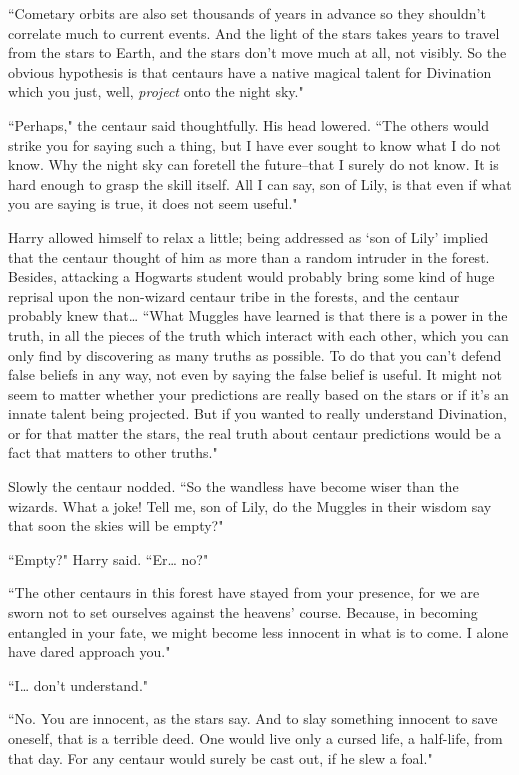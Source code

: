 ``Cometary orbits are also set thousands of years in advance so they shouldn't correlate much to current events. And the light of the stars takes years to travel from the stars to Earth, and the stars don't move much at all, not visibly. So the obvious hypothesis is that centaurs have a native magical talent for Divination which you just, well, \emph{project} onto the night sky."

``Perhaps," the centaur said thoughtfully. His head lowered. ``The others would strike you for saying such a thing, but I have ever sought to know what I do not know. Why the night sky can foretell the future\---that I surely do not know. It is hard enough to grasp the skill itself. All I can say, son of Lily, is that even if what you are saying is true, it does not seem useful."

Harry allowed himself to relax a little; being addressed as `son of Lily' implied that the centaur thought of him as more than a random intruder in the forest. Besides, attacking a Hogwarts student would probably bring some kind of huge reprisal upon the non-wizard centaur tribe in the forests, and the centaur probably knew that{\ldots} ``What Muggles have learned is that there is a power in the truth, in all the pieces of the truth which interact with each other, which you can only find by discovering as many truths as possible. To do that you can't defend false beliefs in any way, not even by saying the false belief is useful. It might not seem to matter whether your predictions are really based on the stars or if it's an innate talent being projected. But if you wanted to really understand Divination, or for that matter the stars, the real truth about centaur predictions would be a fact that matters to other truths."

Slowly the centaur nodded. ``So the wandless have become wiser than the wizards. What a joke! Tell me, son of Lily, do the Muggles in their wisdom say that soon the skies will be empty?"

``Empty?" Harry said. ``Er{\ldots} no?"

``The other centaurs in this forest have stayed from your presence, for we are sworn not to set ourselves against the heavens' course. Because, in becoming entangled in your fate, we might become less innocent in what is to come. I alone have dared approach you."

``I{\ldots} don't understand."

``No. You are innocent, as the stars say. And to slay something innocent to save oneself, that is a terrible deed. One would live only a cursed life, a half-life, from that day. For any centaur would surely be cast out, if he slew a foal."

